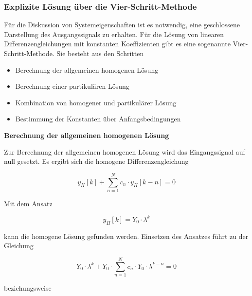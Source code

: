\subsubsection{Explizite L\"{o}sung \"{u}ber die Vier-Schritt-Methode}\label{fourthreetwo}

\noindent F\"{u}r die Diskussion von Systemeigenschaften ist es notwendig, eine geschlossene Darstellung des Ausgangssignals zu erhalten. F\"{u}r die L\"{o}sung von linearen Differenzengleichungen mit konstanten Koeffizienten gibt es eine sogenannte Vier-Schritt-Methode. Sie besteht aus den Schritten

\begin{itemize}
\item  Berechnung der allgemeinen homogenen L\"{o}sung
\item  Berechnung einer partikul\"{a}ren L\"{o}sung
\item  Kombination von homogener und partikul\"{a}rer L\"{o}sung
\item  Bestimmung der Konstanten \"{u}ber Anfangsbedingungen
\end{itemize}

\clearpage


{\selectfont
\noindent\textbf{Berechnung der allgemeinen homogenen Lösung}} \smallskip

\noindent Zur Berechnung der allgemeinen homogenen L\"{o}sung wird das Eingangssignal auf null gesetzt. Es ergibt sich die homogene Differenzengleichung

\begin{equation}\label{eq:fourfourtyseven}
y_{H} \left[k\right]+\sum _{n=1}^{N}c_{n} \cdot y_{H} \left[k-n\right] =0
\end{equation}

\noindent Mit dem Ansatz

\begin{equation}\label{eq:fourfourtyeight}
y_{H} \left[k\right]=Y_{0} \cdot \lambda ^{k} 
\end{equation}

\noindent kann die homogene L\"{o}sung gefunden werden. Einsetzen des Ansatzes f\"{u}hrt zu der Gleichung

\begin{equation}\label{eq:fourfourtynine}
Y_{0} \cdot \lambda ^{k} +Y_{0} \cdot \sum _{n=1}^{N}c_{n} \cdot Y_{0} \cdot \lambda ^{k-n}  =0
\end{equation}

\noindent beziehungsweise

